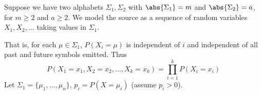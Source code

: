 \documentclass{article}
\begin{document}
Suppose we have two alphabets $\Sigma_1, \Sigma_2$ with $\abs{\Sigma_1} = m$ and $\abs{\Sigma_2} = a$, for $m \geq 2$ and $a \geq 2$.
We model the source as a sequence of random variables $X_1, X_2, \dotsc$ taking values in $\Sigma_1$.
That is, for each $\mu \in \Sigma_1$, $P(X_i = \mu)$ is independent of $i$ and independent of all past and future symbols emitted. Thus
\begin{equation*}
    P(X_1= x_1, X_2 = x_2, \dotsc, X_k = x_k) = \prod_{i = 1}^k P(X_i = x_i)
\end{equation*}
Let $\Sigma_1 = \{\mu_1, \dotsc, \mu_n\}$, $p_i = P(X=\mu_i)$ (assume $p_i > 0$).
\end{document}
